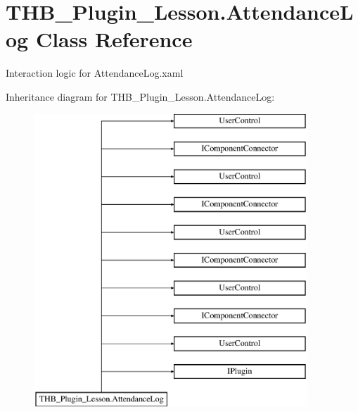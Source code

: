 \hypertarget{class_t_h_b___plugin___lesson_1_1_attendance_log}{}\section{T\+H\+B\+\_\+\+Plugin\+\_\+\+Lesson.\+Attendance\+Log Class Reference}
\label{class_t_h_b___plugin___lesson_1_1_attendance_log}


Interaction logic for Attendance\+Log.\+xaml  


Inheritance diagram for T\+H\+B\+\_\+\+Plugin\+\_\+\+Lesson.\+Attendance\+Log\+:\begin{figure}[H]
\begin{center}
\leavevmode
\includegraphics[height=11.000000cm]{de/d96/class_t_h_b___plugin___lesson_1_1_attendance_log}
\end{center}
\end{figure}

